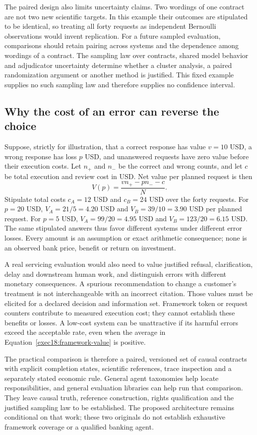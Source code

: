 The paired design also limits uncertainty claims. Two wordings of one
contract are not two new scientific targets. In this example their outcomes
are stipulated to be identical, so treating all forty requests as
independent Bernoulli observations would invent replication. For a future
sampled evaluation, comparisons should retain pairing across systems and
the dependence among wordings of a contract. The sampling law over
contracts, shared model behavior and adjudicator uncertainty determine
whether a cluster analysis, a paired randomization argument or another
method is justified. This fixed example supplies no such sampling law and
therefore supplies no confidence interval.

\subsection{Why the cost of an error can reverse the choice}

Suppose, strictly for illustration, that a correct response has value
$v=10$ USD, a wrong response has loss $p$ USD, and unanswered requests have
zero value before their execution costs. Let $n_{+}$ and $n_{-}$ be the
correct and wrong counts, and let $c$ be total execution and review cost in
USD. Net value per planned request is then
\begin{equation}
 V(p)=\frac{v n_{+}-p n_{-}-c}{N}.
 \label{exec18:framework-value}
\end{equation}
Stipulate total costs $c_A=12$ USD and $c_B=24$ USD over the forty requests.
For $p=20$ USD, $V_A=21/5=4.20$ USD and
$V_B=39/10=3.90$ USD per planned request. For $p=5$ USD,
$V_A=99/20=4.95$ USD and $V_B=123/20=6.15$ USD.
The same stipulated answers thus favor different systems under different
error losses. Every amount is an assumption or exact arithmetic consequence;
none is an observed bank price, benefit or return on investment.
\citep{exec18_framework_reference}

A real servicing evaluation would also need to value justified refusal,
clarification, delay and downstream human work, and distinguish errors
with different monetary consequences. A spurious recommendation to change
a customer's treatment is not interchangeable with an incorrect citation.
Those values must be elicited for a declared decision and information set.
Framework token or request counters contribute to measured execution cost;
they cannot establish these benefits or losses. A low-cost system can be
unattractive if its harmful errors exceed the acceptable rate, even when
the average in Equation~\ref{exec18:framework-value} is positive.

The practical comparison is therefore a paired, versioned set of causal
contracts with explicit completion states, scientific references, trace
inspection and a separately stated economic rule. General agent taxonomies
help locate responsibilities, and general evaluation libraries can help
run that comparison. They leave causal truth, reference construction,
rights qualification and the justified sampling law to be established.
The proposed architecture remains conditional on that work; these two
originals do not establish exhaustive framework coverage or a qualified
banking agent.
